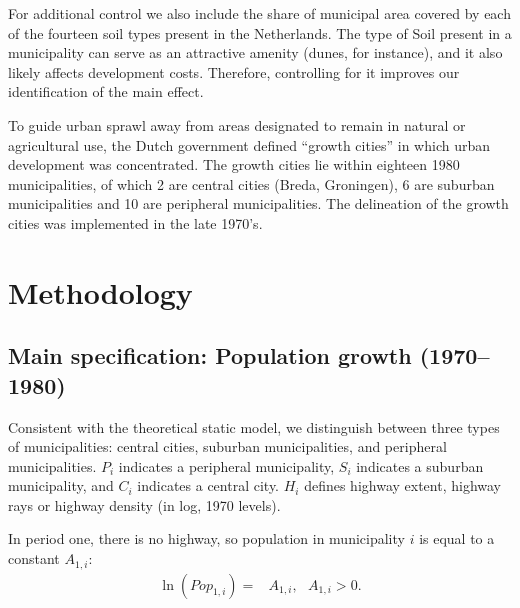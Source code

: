 \documentclass[a4paper,authoryear,review]{elsarticle}  	%
\begin{document}
	For additional control we also include the share of municipal area covered by each of the fourteen soil types present in the Netherlands. The type of Soil present in a municipality can serve as an attractive amenity (dunes, for instance), and it also likely affects development costs. Therefore, controlling for it improves our identification of the main effect.
	
	To guide urban sprawl away from areas designated to remain in natural or agricultural use, the Dutch government defined “growth cities” in which urban development was concentrated. The growth cities lie within eighteen 1980 municipalities, of which 2 are central cities (Breda, Groningen), 6 are suburban municipalities and 10 are peripheral municipalities. The delineation of the growth cities was implemented in the late 1970’s. 
	

\section{Methodology}
\subsection{Main specification: Population growth (1970--1980)}
	Consistent with the theoretical static model, we distinguish between three types of municipalities: central cities, suburban municipalities, and peripheral municipalities. $P_i$ indicates a peripheral municipality, $S_i$ indicates a suburban municipality, and $C_i$ indicates a central city. $H_i$ defines highway extent, highway rays or highway density (in log, 1970 levels). 
	
	In period one, there is no highway, so population in municipality $i$ is equal to a constant $A_{1,i}$:
	\begin{equation}\label{ch3.eq:1a}
		\begin{split}
			\ln(Pop_{1,i}) =& A_{1,i}, \,\,\,\, A_{1,i} > 0 .
		\end{split}
	\end{equation}
	
\end{document}
